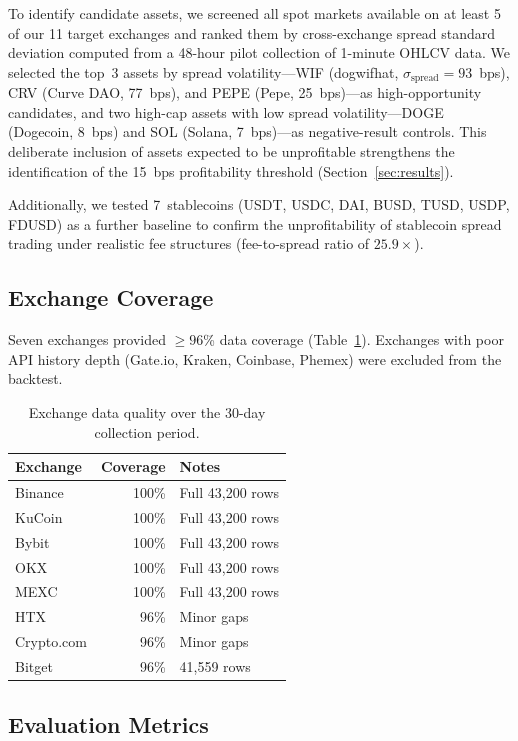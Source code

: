 \documentclass[sigconf,nonacm=false]{acmart}
\begin{document}
To identify candidate assets, we screened all spot markets available on at least 5 of our 11 target exchanges and ranked them by cross-exchange spread standard deviation computed from a 48-hour pilot collection of 1-minute OHLCV data. We selected the top~3 assets by spread volatility---WIF (dogwifhat, $\sigma_{\text{spread}}=93$~bps), CRV (Curve DAO, 77~bps), and PEPE (Pepe, 25~bps)---as high-opportunity candidates, and two high-cap assets with low spread volatility---DOGE (Dogecoin, 8~bps) and SOL (Solana, 7~bps)---as negative-result controls. This deliberate inclusion of assets expected to be unprofitable strengthens the identification of the 15~bps profitability threshold (Section~\ref{sec:results}).

Additionally, we tested 7~stablecoins (USDT, USDC, DAI, BUSD, TUSD, USDP, FDUSD) as a further baseline to confirm the unprofitability of stablecoin spread trading under realistic fee structures (fee-to-spread ratio of $25.9\times$).

\subsection{Exchange Coverage}

Seven exchanges provided $\geq 96$\% data coverage (Table~\ref{tab:exchanges}). Exchanges with poor API history depth (Gate.io, Kraken, Coinbase, Phemex) were excluded from the backtest.

\begin{table}[h]
\caption{Exchange data quality over the 30-day collection period.}
\label{tab:exchanges}
\begin{tabular}{lrl}
\toprule
\textbf{Exchange} & \textbf{Coverage} & \textbf{Notes} \\
\midrule
Binance   & 100\% & Full 43,200 rows \\
KuCoin    & 100\% & Full 43,200 rows \\
Bybit     & 100\% & Full 43,200 rows \\
OKX       & 100\% & Full 43,200 rows \\
MEXC      & 100\% & Full 43,200 rows \\
HTX       & 96\%  & Minor gaps \\
Crypto.com & 96\% & Minor gaps \\
Bitget    & 96\%  & 41,559 rows \\
\bottomrule
\end{tabular}
\end{table}

\subsection{Evaluation Metrics}
\end{document}
